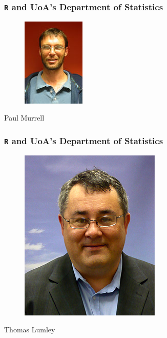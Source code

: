 \documentclass[handout]{beamer}\usepackage[]{graphicx}\usepackage[]{color}
\begin{document}
\begin{frame}
  \frametitle{\texttt{R} and UoA's Department of Statistics}
  \begin{figure}[h]
    \centering
    \includegraphics[width = .3\textwidth, keepaspectratio]{paul.jpg}
  \end{figure}
   \begin{center}
     \Large Paul Murrell
   \end{center}
\end{frame}


\begin{frame}
  \frametitle{\texttt{R} and UoA's Department of Statistics}
  \begin{figure}[h]
    \centering
    \includegraphics[width = .3\textwidth, keepaspectratio]{thomas.jpg}
  \end{figure}
   \begin{center}
     \Large Thomas Lumley
   \end{center}
\end{frame}
\end{document}
